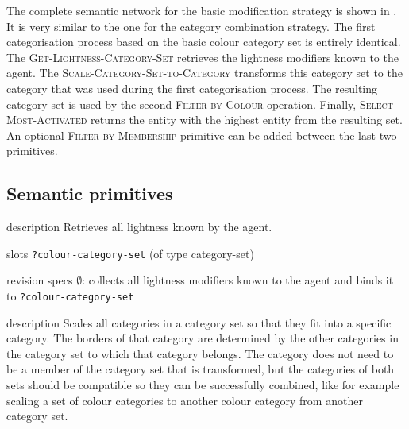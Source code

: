 The complete semantic network for the basic modification
  strategy is shown in . It is
very similar to the one for the category combination
  strategy. The first categorisation process based on the basic
colour category set is entirely identical. The
\textsc{Get-Lightness-Category-Set} retrieves the lightness
modifiers known to the agent. The
\textsc{Scale-Category-Set-to-Category} transforms this category set
to the category that was used during the first categorisation
process. The resulting category set is used by the second
\textsc{Filter-by-Colour} operation. Finally,
\textsc{Select-Most-Activated} returns the entity with the highest
entity from the resulting set. An optional
\textsc{Filter-by-Membership} primitive can be added between the last
two primitives.



\subsection{Semantic primitives}


\begin{explanation}{description}
  Retrieves all lightness known by the agent.
\end{explanation}

\begin{explanation}{slots}
  \verb+?colour-category-set+ (of type category-set)
\end{explanation}

\begin{explanation}{revision specs}
  $\emptyset$: collects all lightness modifiers known to the agent
  and binds it to \verb+?colour-category-set+
\end{explanation}


\begin{explanation}{description}
  Scales all categories in a category set so that they fit into a
  specific category. The borders of that category are determined by
  the other categories in the category set to which that category
  belongs. The category does not need to be a member of the category
  set that is transformed, but the categories of both sets should be
  compatible so they can be successfully combined, like for example
  scaling a set of colour categories to another colour category from
  another category set.
\end{explanation}

